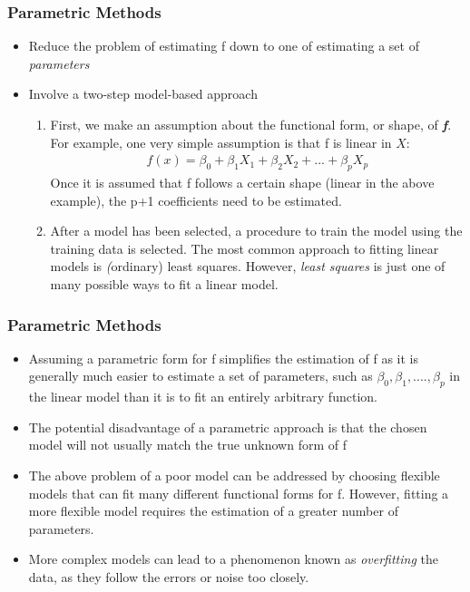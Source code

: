 \documentclass[12]{beamer}
\begin{document}
%
%

\begin{frame}
  \frametitle{Parametric Methods}
  \begin{itemize}
	\addtolength{\itemsep}{5pt}
	\item Reduce the problem of estimating f down to one of estimating a set of \textit{parameters}
	\item Involve a two-step model-based approach
	\begin{enumerate}
	  	\item First, we make an assumption about the functional form, or shape, of \textbf{\textit{f}}. For example, one very simple assumption is that f is linear in $X$:
	  	\begin{align*}
	  	  f(x) = \beta_{0} + \beta_{1}X_{1} + \beta_{2}X_{2} + ... + \beta_{p}X_{p}
	  	\end{align*}
	  	Once it is assumed that f follows a certain shape (linear in the above example), the p+1 coefficients need to be estimated.
	  	
	  	\item After a model has been selected, a procedure to train the model using the training data is selected. The most common
	  	approach to fitting linear models is \textit(ordinary) least squares. However, \textit{least squares} is just one of many possible
	  	ways to fit a linear model.
	\end{enumerate}
  \end{itemize}
\end{frame}

\begin{frame}
  \frametitle{Parametric Methods }
  \begin{itemize}
    \addtolength{\itemsep}{5pt}
    \item Assuming a parametric form for f simplifies the estimation of f as it is generally much easier to estimate a set of parameters,
    such as $\beta_{0}, \beta_{1}, ...., \beta_{p}$ in the linear model than it is to fit an entirely arbitrary function.
    \item The potential disadvantage of a parametric approach is that the chosen model will not usually match the true unknown form
    of f
    \item The above problem of a poor model can be addressed by choosing flexible models that can fit many different functional forms
    for f. However, fitting a more flexible model requires the estimation of a greater number of parameters.
    \item More complex models can lead to a phenomenon known as \textit{overfitting} the data, as they follow the errors or noise too
    closely.
  \end{itemize}
\end{frame}
\end{document}
